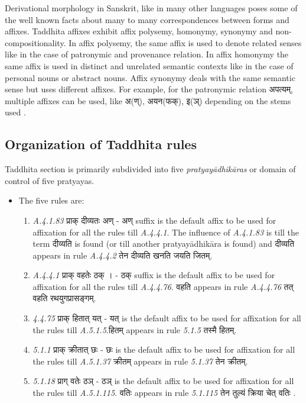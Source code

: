 \documentclass[11pt]{article}
\begin{document}
Derivational morphology in Sanskrit, like in many other languages poses some of the well
known facts about many to many correspondences between forms and affixes. Taddhita affixes exhibit affix polysemy, homonymy, synonymy and non-compositionality. In affix polysemy, the same
affix is used to denote related senses like in the case of patronymic and provenance relation. In affix homonymy the same affix is used in distinct and unrelated semantic contexts like in the case of personal nouns or abstract nouns. Affix synonymy deals with the same semantic sense but
uses different affixes. For example, for the patronymic relation {\skt अपत्यम्}, multiple affixes can be used, like {\skt अ(ण्), अयन(फक्), इ(ञ्)} depending on the stems used \cite{deo07}.
\\
\subsection{Organization of Taddhita rules}
\label{orgTad}
Taddhita section is primarily subdivided into five {\sl pratyayādhikāras} or domain of control
of five pratyayas.
\renewcommand{\labelitemi}{$\blacksquare$}
\begin{itemize}
  \item The five rules are:
\renewcommand{\labelenumi}{$\Roman{enumi}$}
\begin{enumerate}


  \item {\sl A.4.1.83} {\skt प्राक् दीव्यतः अण् } - {\skt अण् } suffix is the default affix to be used for affixation for all the rules till {\sl A.4.4.1}. The influence of {\sl A.4.1.83} is till the term {\skt दीव्यति} is found (or till another pratyayādhikāra is found) and {\skt दीव्यति} appears in rule {\sl A.4.4.2} {\skt  तेन दीव्यति खनति जयति जितम्}. 
  \item {\sl A.4.4.1} {\skt  प्राक् वहतेः ठक् । } - {\skt ठक् } suffix is the default affix to be used for affixation for all the rules till {\sl A.4.4.76}. {\skt  वहति} appears in rule {\sl A.4.4.76} {\skt तत् वहति रथयुगप्रासङ्गम्}.
  \item {\sl 4.4.75} {\skt प्राक् हितात् यत् } - {\skt यत् } is the default affix to be used for affixation for all the rules till {\sl A.5.1.5}.{\skt हितम्} appears in rule {\sl 5.1.5} {\skt  तस्मै हितम्}. 
  \item {\sl 5.1.1} {\skt  प्राक् क्रीतात् छः } - {\skt छः } is the default affix to be used for affixation for all the rules till {\sl A.5.1.37 }{\skt  क्रीतम्} appears in rule {\sl 5.1.37} {\skt तेन क्रीतम्}.
  \item {\sl 5.1.18} {\skt प्राग् वतेः ठञ् } - {\skt ठञ् }is the default affix to be used for affixation for all the rules till {\sl A.5.1.115}. {\skt वतिः} appears in rule {\sl 5.1.115} {\skt  तेन तुल्यं क्रिया चेत् वतिः }. 
  
\end{enumerate}
\end{itemize}
\end{document}
